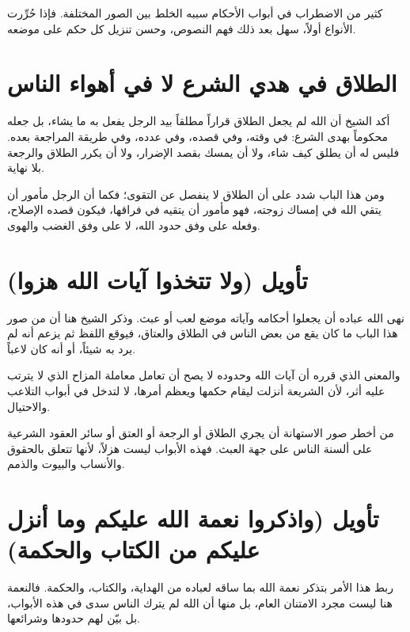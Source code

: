 \begin{fawaid}
كثير من الاضطراب في أبواب الأحكام سببه الخلط بين الصور المختلفة. فإذا حُرِّرت الأنواع أولاً، سهل بعد ذلك فهم النصوص، وحسن تنزيل كل حكم على موضعه.
\end{fawaid}

\section{الطلاق في هدي الشرع لا في أهواء الناس}
أكد الشيخ أن الله لم يجعل الطلاق قراراً مطلقاً بيد الرجل يفعل به ما يشاء، بل جعله محكوماً بهدى الشرع: في وقته، وفي قصده، وفي عدده، وفي طريقة المراجعة بعده. فليس له أن يطلق كيف شاء، ولا أن يمسك بقصد الإضرار، ولا أن يكرر الطلاق والرجعة بلا نهاية.

ومن هذا الباب شدد على أن الطلاق لا ينفصل عن التقوى؛ فكما أن الرجل مأمور أن يتقي الله في إمساك زوجته، فهو مأمور أن يتقيه في فراقها، فيكون قصده الإصلاح، وفعله على وفق حدود الله، لا على وفق الغضب والهوى.

\separator

\section{تأويل (ولا تتخذوا آيات الله هزوا)}
 نهى الله عباده أن يجعلوا أحكامه وآياته موضع لعب أو عبث. وذكر الشيخ هنا أن من صور هذا الباب ما كان يقع من بعض الناس في الطلاق والعتاق، فيوقع اللفظ ثم يزعم أنه لم يرد به شيئاً، أو أنه كان لاعباً.

والمعنى الذي قرره  أن آيات الله وحدوده لا يصح أن تعامل معاملة المزاح الذي لا يترتب عليه أثر، لأن الشريعة أنزلت ليقام حكمها ويعظم أمرها، لا لتدخل في أبواب التلاعب والاحتيال.

\begin{fawaid}
من أخطر صور الاستهانة أن يجري الطلاق أو الرجعة أو العتق أو سائر العقود الشرعية على ألسنة الناس على جهة العبث. فهذه الأبواب ليست هزلاً، لأنها تتعلق بالحقوق والأنساب والبيوت والذمم.
\end{fawaid}

\section{تأويل (واذكروا نعمة الله عليكم وما أنزل عليكم من الكتاب والحكمة)}
ربط  هذا الأمر بتذكر نعمة الله بما ساقه لعباده من الهداية، والكتاب، والحكمة. فالنعمة هنا ليست مجرد الامتنان العام، بل منها أن الله لم يترك الناس سدى في هذه الأبواب، بل بيّن لهم حدودها وشرائعها.

